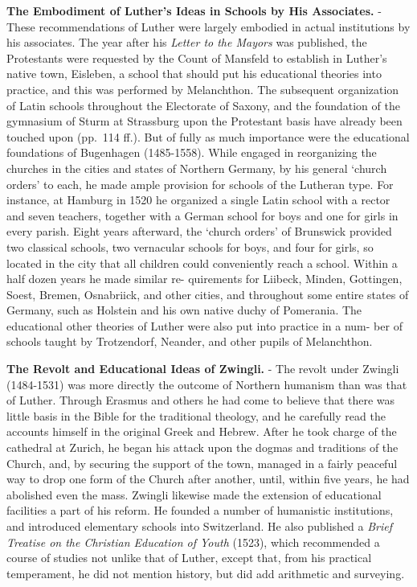 \documentclass[
]{book}
\begin{document}
\textbf{The Embodiment of Luther's Ideas in Schools by His Associates.} - These recommendations of Luther were largely embodied in actual institutions by his associates. The year after his \emph{Letter to the Mayors} was published, the Protestants were requested by the Count of Mansfeld to establish in Luther's native town, Eisleben, a school that should put his educational theories into practice, and this was performed by Melanchthon. The subsequent organization of Latin schools throughout the Electorate of Saxony, and the foundation of the gymnasium of Sturm at Strassburg upon the Protestant basis have already been touched upon (pp.~114 ff.). But of fully as much importance were the educational foundations of Bugenhagen (1485-1558). While engaged in reorganizing the churches in the cities and states of Northern Germany, by his general `church orders' to each, he made ample provision for schools of the Lutheran type. For instance, at Hamburg in 1520 he organized a single Latin school with a rector and seven teachers, together with a German school for boys and one for girls in every parish. Eight years afterward, the `church orders' of Brunswick provided two classical schools, two vernacular schools for boys, and four for girls, so located in the city that all children could conveniently reach a school. Within a half dozen years he made similar re- quirements for Liibeck, Minden, Gottingen, Soest, Bremen, Osnabriick, and other cities, and throughout some entire states of Germany, such as Holstein and his own native duchy of Pomerania. The educational other theories of Luther were also put into practice in a num- ber of schools taught by Trotzendorf, Neander, and other pupils of Melanchthon.

\textbf{The Revolt and Educational Ideas of Zwingli.} - The revolt under Zwingli (1484-1531) was more directly the outcome of Northern humanism than was that of Luther. Through Erasmus and others he had come to believe that there was little basis in the Bible for the traditional theology, and he carefully read the accounts himself in the original Greek and Hebrew. After he took charge of the cathedral at Zurich, he began his attack upon the dogmas and traditions of the Church, and, by securing the support of the town, managed in a fairly peaceful way to drop one form of the Church after another, until, within five years, he had abolished even the mass. Zwingli likewise made the extension of educational facilities a part of his reform. He founded a number of humanistic institutions, and introduced elementary schools into Switzerland. He also published a \emph{Brief Treatise on the Christian Education of Youth} (1523), which recommended a course of studies not unlike that of Luther, except that, from his practical temperament, he did not mention history, but did add arithmetic and surveying.
\end{document}
